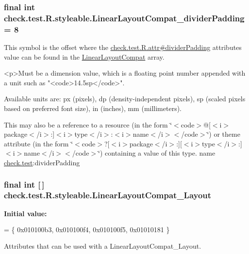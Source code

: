 \subsubsection[{Linear\+Layout\+Compat\+\_\+divider\+Padding}]{\setlength{\rightskip}{0pt plus 5cm}final int check.\+test.\+R.\+styleable.\+Linear\+Layout\+Compat\+\_\+divider\+Padding = 8\hspace{0.3cm}{\ttfamily [static]}}\label{classcheck_1_1test_1_1_r_1_1styleable_afdc801825abf8606d597921106733dda}
This symbol is the offset where the \hyperlink{classcheck_1_1test_1_1_r_1_1attr_a9f8b7dc92e7e2974335ab3d696aa83cf}{check.\+test.\+R.\+attr\#divider\+Padding} attribute\textquotesingle{}s value can be found in the \hyperlink{classcheck_1_1test_1_1_r_1_1styleable_a1cee5a37a541e5cb360983f35ebfe0fc}{Linear\+Layout\+Compat} array.

\begin{DoxyVerb}      <p>Must be a dimension value, which is a floating point number appended with a unit such as "<code>14.5sp</code>".
\end{DoxyVerb}
 Available units are\+: px (pixels), dp (density-\/independent pixels), sp (scaled pixels based on preferred font size), in (inches), mm (millimeters). 

This may also be a reference to a resource (in the form \char`\"{}$<$code$>$@\mbox{[}$<$i$>$package$<$/i$>$\+:\mbox{]}$<$i$>$type$<$/i$>$\+:$<$i$>$name$<$/i$>$$<$/code$>$\char`\"{}) or theme attribute (in the form \char`\"{}$<$code$>$?\mbox{[}$<$i$>$package$<$/i$>$\+:\mbox{]}\mbox{[}$<$i$>$type$<$/i$>$\+:\mbox{]}$<$i$>$name$<$/i$>$$<$/code$>$\char`\"{}) containing a value of this type.  name \hyperlink{namespacecheck_1_1test}{check.\+test}\+:divider\+Padding \hypertarget{classcheck_1_1test_1_1_r_1_1styleable_a06b8cec0701fce506df2a245c8c71b9d}{}
\subsubsection[{Linear\+Layout\+Compat\+\_\+\+Layout}]{\setlength{\rightskip}{0pt plus 5cm}final int \mbox{[}$\,$\mbox{]} check.\+test.\+R.\+styleable.\+Linear\+Layout\+Compat\+\_\+\+Layout\hspace{0.3cm}{\ttfamily [static]}}\label{classcheck_1_1test_1_1_r_1_1styleable_a06b8cec0701fce506df2a245c8c71b9d}
{\bfseries Initial value\+:}
\begin{DoxyCode}
= \{
            0x010100b3, 0x010100f4, 0x010100f5, 0x01010181
        \}
\end{DoxyCode}
Attributes that can be used with a Linear\+Layout\+Compat\+\_\+\+Layout. 

